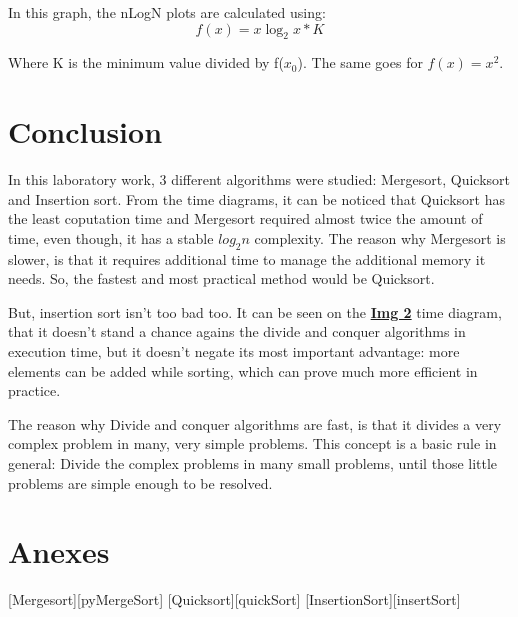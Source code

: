 \documentclass{article}
\begin{document}
		\par In this graph, the nLogN plots are calculated using:
		\[
			f(x) = x\log_2 {x} * K
		\]
		\par Where K is the minimum value divided by f($x_0$). The same goes for \(f(x) = x^2\).


	\newpage
	\section{Conclusion}
		\def \hyperRefToImgTwo {
			\hyperref[fig:AllAlgsTimes]{\textbf{{\color{blue} Img 2}}}
		}
		\par In this laboratory work, 3 different algorithms were studied: Mergesort, Quicksort and Insertion sort. From the time diagrams, it can be noticed that Quicksort has the least coputation time and Mergesort required almost twice the amount of time, even though, it has a stable \(log_2 {n}\) complexity. The reason why Mergesort is slower, is that it requires additional time to manage the additional memory it needs. So, the fastest and most practical method would be Quicksort.
		\par But, insertion sort isn't too bad too. It can be seen on the \hyperRefToImgTwo time diagram, that it doesn't stand a chance agains the divide and conquer algorithms in execution time, but it doesn't negate its most important advantage: more elements can be added while sorting, which can prove much more efficient in practice.
		\par The reason why Divide and conquer algorithms are fast, is that it divides a very complex problem in many, very simple problems. This concept is a basic rule in general: Divide the complex problems in many small problems, until those little problems are simple enough to be resolved.

	\newpage
	\section{Anexes}
		[Mergesort][pyMergeSort]
		[Quicksort][quickSort]
		[InsertionSort][insertSort]
\end{document}
